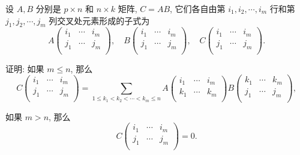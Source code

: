 \documentclass[color=black,device=normal,lang=cn,mode=geye]{elegantnote}
\begin{document}
\begin{exercisec}[4.3.7]
    设 $A,B$ 分别是 $p\times n$ 和 $n\times k$ 矩阵, $C=AB$, 它们各自由第 $i_1,i_2,\cdots,i_m$ 行和第 $j_1,j_2,\cdots,j_m$ 列交叉处元素形成的子式为
    \[A\begin{pmatrix}
        i_1 & \cdots & i_m \\
        j_1 & \cdots & j_m \\
    \end{pmatrix},\quad B\begin{pmatrix}
        i_1 & \cdots & i_m \\
        j_1 & \cdots & j_m \\
    \end{pmatrix},\quad C\begin{pmatrix}
        i_1 & \cdots & i_m \\
        j_1 & \cdots & j_m \\
    \end{pmatrix}.\]

    证明: 如果 $m\leq n$, 那么
    \[C\begin{pmatrix}
        i_1 & \cdots & i_m \\
        j_1 & \cdots & j_m \\
    \end{pmatrix}=\sum\limits_{1\leq k_1<k_2<\cdots<k_m\leq n}A\begin{pmatrix}
        i_1 & \cdots & i_m \\
        k_1 & \cdots & k_m \\
    \end{pmatrix}B\begin{pmatrix}
        k_1 & \cdots & k_m \\
        j_1 & \cdots & j_m \\
    \end{pmatrix},\]

    如果 $m>n$, 那么
    \[C\begin{pmatrix}
        i_1 & \cdots & i_m \\
        j_1 & \cdots & j_m \\
    \end{pmatrix}=0.\]
\end{exercisec}
\end{document}
